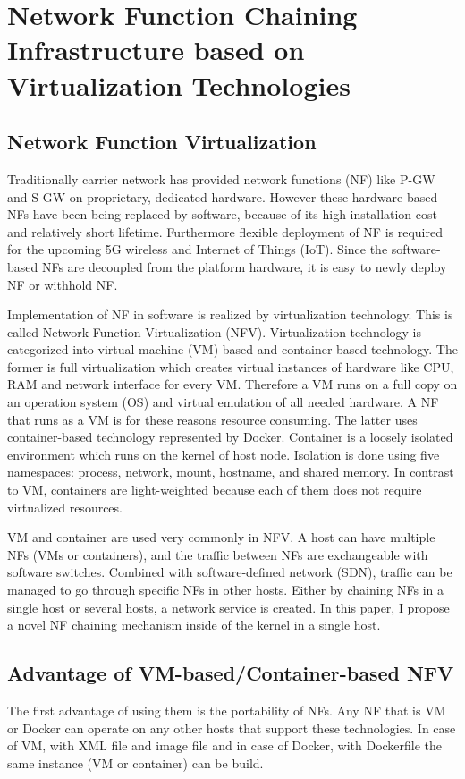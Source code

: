\section{Network Function Chaining Infrastructure based on Virtualization Technologies} 
\subsection{Network Function Virtualization}
Traditionally carrier network has provided network functions (NF) like P-GW and S-GW on proprietary, dedicated hardware. However these hardware-based NFs have been being replaced by software, because of its high installation cost and relatively short lifetime. Furthermore flexible deployment of NF is required for the upcoming 5G wireless and Internet of Things (IoT). Since the software-based NFs are decoupled from the platform hardware, it is easy to newly deploy NF or withhold NF. 

Implementation of NF in software is realized by virtualization technology. This is called Network Function Virtualization (NFV). Virtualization technology is categorized into virtual machine (VM)-based and container-based technology. The former is full virtualization which creates virtual instances of hardware like CPU, RAM and network interface for every VM. Therefore a VM runs on a full copy on an operation system (OS) and virtual emulation of all needed hardware. A NF that runs as a VM is for these reasons resource consuming. The latter uses container-based technology represented by Docker\cite{Docker}. Container is a loosely isolated environment which runs on the kernel of host node. Isolation is done using five namespaces: process, network, mount, hostname, and shared memory. In contrast to VM, containers are light-weighted because each of them does not require virtualized resources.  

VM and container are used very commonly in NFV. A host can have multiple NFs (VMs or containers), and the traffic between NFs are exchangeable with software switches. Combined with software-defined network (SDN), traffic can be managed to go through specific NFs in other hosts. Either by chaining NFs in a single host or several hosts, a network service is created. In this paper, I propose a novel NF chaining mechanism inside of the kernel in a single host. 


\subsection{Advantage of VM-based/Container-based NFV}
The first advantage of using them is the portability of NFs. Any NF that is VM or Docker can operate on any other hosts that support these technologies. In case of VM, with XML file and image file and in case of Docker, with Dockerfile the same instance (VM or container) can be build. 

